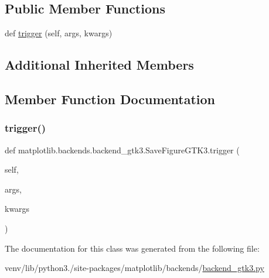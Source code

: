 \subsection*{Public Member Functions}
\begin{DoxyCompactItemize}
\item 
def \hyperlink{classmatplotlib_1_1backends_1_1backend__gtk3_1_1SaveFigureGTK3_a56801b77e086dae94c6eab6e9f245d41}{trigger} (self, args, kwargs)
\end{DoxyCompactItemize}
\subsection*{Additional Inherited Members}


\subsection{Member Function Documentation}
\mbox{\label{classmatplotlib_1_1backends_1_1backend__gtk3_1_1SaveFigureGTK3_a56801b77e086dae94c6eab6e9f245d41}} 
\subsubsection{\texorpdfstring{trigger()}{trigger()}}
{\footnotesize\ttfamily def matplotlib.\+backends.\+backend\+\_\+gtk3.\+Save\+Figure\+G\+T\+K3.\+trigger (\begin{DoxyParamCaption}\item[{}]{self,  }\item[{}]{args,  }\item[{}]{kwargs }\end{DoxyParamCaption})}



The documentation for this class was generated from the following file\+:\begin{DoxyCompactItemize}
\item 
venv/lib/python3./site-\/packages/matplotlib/backends/\hyperlink{backend__gtk3_8py}{backend\+\_\+gtk3.\+py}\end{DoxyCompactItemize}
